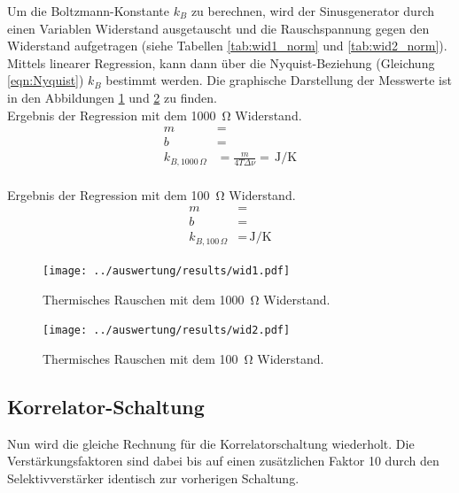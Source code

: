 Um die Boltzmann-Konstante $k_B$ zu berechnen, wird der Sinusgenerator durch einen Variablen Widerstand ausgetauscht und die Rauschspannung gegen den Widerstand aufgetragen (siehe Tabellen \ref{tab:wid1_norm} und \ref{tab:wid2_norm}). Mittels linearer Regression, kann dann über die Nyquist-Beziehung (Gleichung \ref{eqn:Nyquist}) $k_B$ bestimmt werden. Die graphische Darstellung der Messwerte ist in den Abbildungen \ref{fig:thermRauschen1} und \ref{fig:thermRauschen2} zu finden.\\

Ergebnis der Regression mit dem \SI{1000}{\ohm} Widerstand.
\begin{align*}
	m &= \\
	b &= \\
	k_{B,1000\,\Omega} &= \frac{m}{4T\Delta\nu} =\,\si{\joule\per\kelvin}\\
\end{align*}

Ergebnis der Regression mit dem \SI{100}{\ohm} Widerstand.
\begin{align*}
m &= \\
b &= \\
k_{B,100\,\Omega} &= \,\si{\joule\per\kelvin}
\end{align*}

\begin{figure}[H]
	\texttt{[image: ../auswertung/results/wid1.pdf]}
	\caption{Thermisches Rauschen mit dem \SI{1000}{\ohm} Widerstand.}
	\label{fig:thermRauschen1}
\end{figure}

\begin{figure}[H]
	\texttt{[image: ../auswertung/results/wid2.pdf]}
	\caption{Thermisches Rauschen mit dem \SI{100}{\ohm} Widerstand.}
	\label{fig:thermRauschen2}
\end{figure}


\subsection{Korrelator-Schaltung}
Nun wird die gleiche Rechnung für die Korrelatorschaltung wiederholt. Die Verstärkungsfaktoren sind dabei bis auf einen zusätzlichen Faktor 10 durch den Selektivverstärker identisch zur vorherigen Schaltung.

